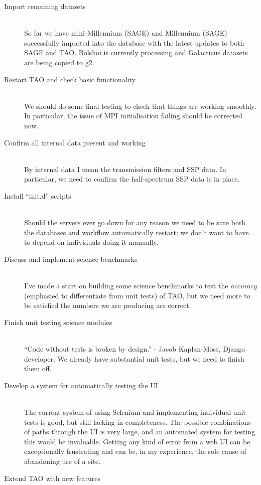 \documentclass[12pt]{scrartcl}
\begin{document}
\begin{description}
  \item[Import remaining datasets] \hfill \\
    So far we have mini-Millennium (SAGE) and Millennium (SAGE)
    successfully imported into the database with the latest updates to
    both SAGE and TAO. Bolshoi is currently processing and Galacticus
    datasets are being copied to g2.
  \item[Restart TAO and check basic functionality] \hfill \\
    We should do some final testing to check that things are working
    smoothly. In particular, the issue of MPI initialisation failing
    should be corrected now.
  \item[Confirm all internal data present and working] \hfill \\
    By internal data I mean the transmission filters and SSP data. In
    particular, we need to confirm the half-spectrum SSP data is in
    place.
  \item[Install ``init.d'' scripts] \hfill \\
    Should the servers ever go down for any reason we need to be sure
    both the databases and workflow automatically restart; we don't
    want to have to depend on individuals doing it manually.
  \item[Discuss and implement science benchmarks] \hfill \\
    I've made a start on building some science benchmarks to test the
    \emph{accuracy} (emphasied to differentiate from unit tests) of
    TAO, but we need more to be satisfied the numbers we are producing
    are correct.
  \item[Finish unit testing science modules] \hfill \\
    ``Code without tests is broken by design.'' - Jacob Kaplan-Moss,
    Django developer. We already have substantial unit tests, but we
    need to finish them off.
  \item[Develop a system for automatically testing the UI] \hfill \\
    The current system of using Selenium and implementing individual
    unit tests is good, but still lacking in completeness. The
    possible combinations of paths through the UI is very large, and
    an automated system for testing this would be invaluable. Getting
    any kind of error from a web UI can be exceptionally frustrating
    and can be, in my experience, the sole cause of abandoning use of
    a site.
  \item[Extend TAO with new features] \hfill \\

\end{description}
\end{document}
